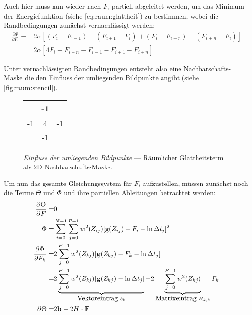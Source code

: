 Auch hier muss nun wieder nach $F_i$ partiell abgeleitet werden, um das Minimum der Energiefunktion (siehe \autoref{eq:raum:glattheit}) zu bestimmen, wobei die Randbedingungen zunächst vernachlässigt werden:
\begin{align}
\label{eq:raum:derivate}
\frac{\partial \Psi}{\partial F_i} =& 2\alpha[(F_i - F_{i-1}) - (F_{i+1} - F_i) + (F_i - F_{i-n})-(F_{i+n}- F_i)]\\
=&2\alpha[4 F_i-F_{i-n} - F_{i-1} - F_{i+1} - F_{i+n}]
\end{align}

Unter vernachlässigten Randbedingungen entsteht also eine Nachbarschafts-Maske die den Einfluss der umliegenden Bildpunkte angibt (siehe \autoref{fig:raum:stencil}). 

\begin{figure}
  \begin{center}
    \begin{tabular}{c|c|c}
        \cline{2-2}
        & -1 & \\
        \hline
        \multicolumn{1}{|c|}{-1}
        & 4 & \multicolumn{1}{c|}{-1}\\
        \hline
        & -1 & \\
        \cline{2-2} 
    \end{tabular}
  \end{center}
\caption{\textit{Einfluss der umliegenden Bildpunkte} --- Räumlicher Glattheitsterm als 2D Nachbarschafts-Maske.}
\label{fig:raum:stencil}
\end{figure}

Um nun das gesamte Gleichungssystem für $F_i$ aufzustellen, müssen zunächst noch die Terme $\Theta$ und $\Phi$ und ihre partiellen Ableitungen betrachtet werden:
\begin{align}
\frac{\partial \Theta}{\partial F} =& 0\\
\Phi =&\sum_{i=0}^{N-1} \sum_{j=0}^{P-1} w^2(Z_{ij})[\mathbf g(Z_{ij}) - F_i - \ln \Delta t_j]^2\\
\frac{\partial \Phi}{\partial F_k} =& 2 \sum_{j=0}^{P-1} w^2(Z_{kj})[\mathbf g(Z_{kj}) -F_k-\ln \Delta t_j]\\
\label{eq:raum:phi}
=& 2 \underbrace{
		\sum_{j=0}^{P-1} w^2(Z_{kj})[\mathbf g(Z_{kj}) -\ln \Delta t_j]
	}_{
		\mbox{Vektoreintrag }b_k
	} 
	- 2 \underbrace{
		\sum_{j=0}^{P-1} w^2(Z_{kj})
	}_{
		\mbox{Matrixeintrag } H_{k,k}
	}
	F_k\\
\label{eq:raum:phi:matrix}
\partial \Theta =& 2 \mathbf b - 2 H \cdot \mathbf F
\end{align}


